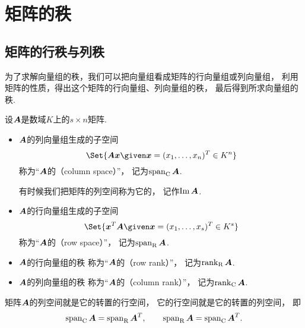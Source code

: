 \section{矩阵的秩}
\subsection{矩阵的行秩与列秩}
为了求解向量组的秩，我们可以把向量组看成矩阵的行向量组或列向量组，
利用矩阵的性质，得出这个矩阵的行向量组、列向量组的秩，
最后得到所求向量组的秩.

\begin{definition}\label{definition:线性方程组.行秩与列秩的定义}
设\(\boldsymbol{A}\)是数域\(K\)上的\(s \times n\)矩阵.
\begin{itemize}
	\item \(\boldsymbol{A}\)的列向量组生成的子空间\begin{equation*}
		\Set{
			\vb{A}\vb{x} \given \vb{x}=(x_1,\dotsc,x_n)^T \in K^n
		}
	\end{equation*}
	称为“\(\boldsymbol{A}\)的（column space）”，
	记为\(\operatorname{span}_{\mathrm{C}}\boldsymbol{A}\).

	有时候我们把矩阵的列空间称为它的，
	记作\(\operatorname{Im}\boldsymbol{A}\).

	\item \(\boldsymbol{A}\)的行向量组生成的子空间\begin{equation*}
		\Set{
			\vb{x}^T\vb{A} \given \vb{x}=(x_1,\dotsc,x_s)^T \in K^s
		}
	\end{equation*}
	称为“\(\boldsymbol{A}\)的（row space）”，
	记为\(\operatorname{span}_{\mathrm{R}}\boldsymbol{A}\).

	\item \(\boldsymbol{A}\)的行向量组的秩
	称为“\(\boldsymbol{A}\)的（row rank）”，
	记为\(\rank_{\mathrm{R}}\boldsymbol{A}\).

	\item \(\boldsymbol{A}\)的列向量组的秩
	称为“\(\boldsymbol{A}\)的（column rank）”，
	记为\(\rank_{\mathrm{C}}\boldsymbol{A}\).
\end{itemize}
\end{definition}

矩阵\(\boldsymbol{A}\)的列空间就是它的转置的行空间，
它的行空间就是它的转置的列空间，
即\begin{equation*}
	\operatorname{span}_{\mathrm{C}}\boldsymbol{A} = \operatorname{span}_{\mathrm{R}}\boldsymbol{A}^T,
	\qquad
	\operatorname{span}_{\mathrm{R}}\boldsymbol{A} = \operatorname{span}_{\mathrm{C}}\boldsymbol{A}^T.
\end{equation*}

